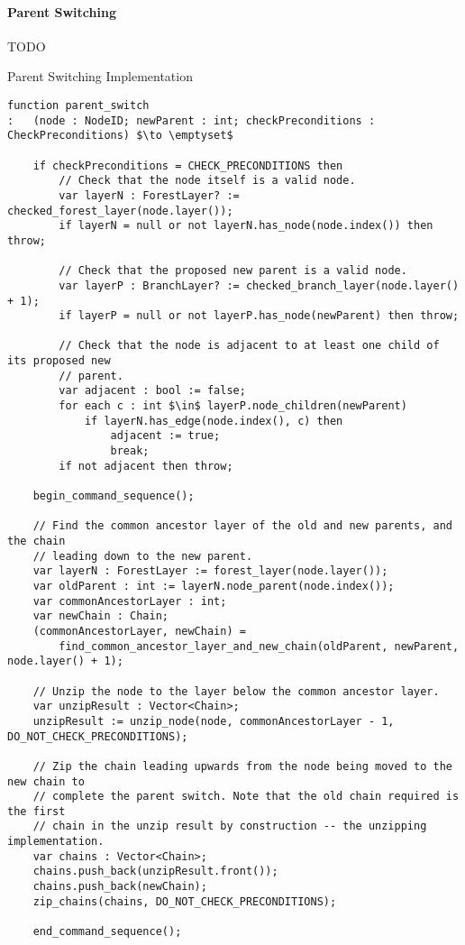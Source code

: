 \paragraph{Parent Switching}

TODO

\begin{stulisting}[p]
\caption{Parent Switching Implementation}
\label{code:ipfs-forest-parentswitch}
\begin{lstlisting}[style=Default]
function parent_switch
:	(node : NodeID; newParent : int; checkPreconditions : CheckPreconditions) $\to \emptyset$

	if checkPreconditions = CHECK_PRECONDITIONS then
		// Check that the node itself is a valid node.
		var layerN : ForestLayer? := checked_forest_layer(node.layer());
		if layerN = null or not layerN.has_node(node.index()) then throw;

		// Check that the proposed new parent is a valid node.
		var layerP : BranchLayer? := checked_branch_layer(node.layer() + 1);
		if layerP = null or not layerP.has_node(newParent) then throw;

		// Check that the node is adjacent to at least one child of its proposed new
		// parent.
		var adjacent : bool := false;
		for each c : int $\in$ layerP.node_children(newParent)
			if layerN.has_edge(node.index(), c) then
				adjacent := true;
				break;
		if not adjacent then throw;

	begin_command_sequence();

	// Find the common ancestor layer of the old and new parents, and the chain
	// leading down to the new parent.
	var layerN : ForestLayer := forest_layer(node.layer());
	var oldParent : int := layerN.node_parent(node.index());
	var commonAncestorLayer : int;
	var newChain : Chain;
	(commonAncestorLayer, newChain) =
		find_common_ancestor_layer_and_new_chain(oldParent, newParent, node.layer() + 1);

	// Unzip the node to the layer below the common ancestor layer.
	var unzipResult : Vector<Chain>;
	unzipResult := unzip_node(node, commonAncestorLayer - 1, DO_NOT_CHECK_PRECONDITIONS);

	// Zip the chain leading upwards from the node being moved to the new chain to
	// complete the parent switch. Note that the old chain required is the first
	// chain in the unzip result by construction -- the unzipping implementation.
	var chains : Vector<Chain>;
	chains.push_back(unzipResult.front());
	chains.push_back(newChain);
	zip_chains(chains, DO_NOT_CHECK_PRECONDITIONS);

	end_command_sequence();
\end{lstlisting}
\end{stulisting}

